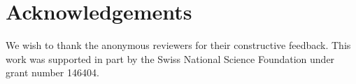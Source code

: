\section*{Acknowledgements}
We wish to thank the anonymous reviewers for their constructive feedback.
This work was supported in part by the Swiss National Science Foundation under grant number 146404.